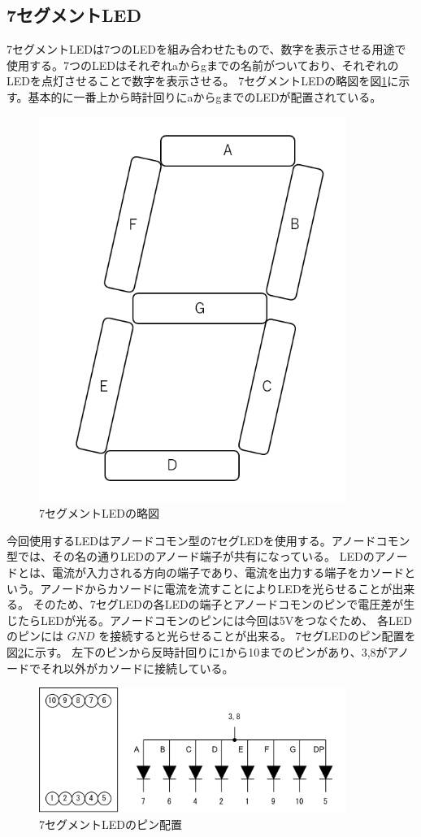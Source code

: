 \documentclass[a4paper,11pt]{jsarticle}
\begin{document}
\subsection{7セグメントLED}
7セグメントLEDは7つのLEDを組み合わせたもので、数字を表示させる用途で使用する。7つのLEDはそれぞれaからgまでの名前がついており、それぞれのLEDを点灯させることで数字を表示させる。
7セグメントLEDの略図を図\ref{fig:7seg}に示す。基本的に一番上から時計回りにaからgまでのLEDが配置されている。
\begin{figure}[h]
  \centering
  \includegraphics[width=10cm]{./images/7seg.png}
  \caption{7セグメントLEDの略図}
  \label{fig:7seg}
\end{figure}
今回使用するLEDはアノードコモン型の7セグLEDを使用する。アノードコモン型では、その名の通りLEDのアノード端子が共有になっている。
LEDのアノードとは、電流が入力される方向の端子であり、電流を出力する端子をカソードという。アノードからカソードに電流を流すことによりLEDを光らせることが出来る。
そのため、7セグLEDの各LEDの端子とアノードコモンのピンで電圧差が生じたらLEDが光る。アノードコモンのピンには今回は5Vをつなぐため、
各LEDのピンには $GND$ を接続すると光らせることが出来る。
7セグLEDのピン配置を図\ref{fig:7segpin}に示す。
左下のピンから反時計回りに1から10までのピンがあり、3,8がアノードでそれ以外がカソードに接続している。
\begin{figure}[h]
  \centering
  \includegraphics[width=10cm]{./images/7segpin.png}
  \caption{7セグメントLEDのピン配置}
  \label{fig:7segpin}
\end{figure}
\end{document}
